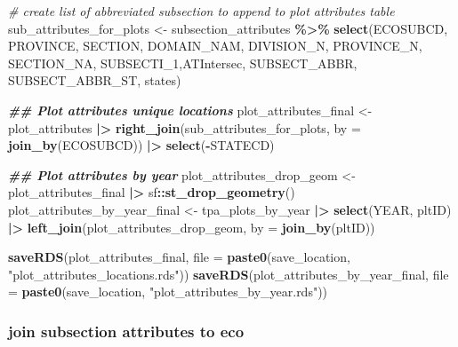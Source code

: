 \documentclass[
]{book}
\newenvironment{Shaded}{\begin{snugshade}}{\end{snugshade}}
\newcommand{\AttributeTok}[1]{\textcolor[rgb]{0.13,0.29,0.53}{#1}}
\newcommand{\CommentTok}[1]{\textcolor[rgb]{0.56,0.35,0.01}{\textit{#1}}}
\newcommand{\DocumentationTok}[1]{\textcolor[rgb]{0.56,0.35,0.01}{\textbf{\textit{#1}}}}
\newcommand{\FunctionTok}[1]{\textcolor[rgb]{0.13,0.29,0.53}{\textbf{#1}}}
\newcommand{\NormalTok}[1]{#1}
\newcommand{\OtherTok}[1]{\textcolor[rgb]{0.56,0.35,0.01}{#1}}
\newcommand{\SpecialCharTok}[1]{\textcolor[rgb]{0.81,0.36,0.00}{\textbf{#1}}}
\newcommand{\StringTok}[1]{\textcolor[rgb]{0.31,0.60,0.02}{#1}}
\begin{document}
\begin{Shaded}
\begin{Highlighting}[]
\CommentTok{\# create list of abbreviated subsection to append to plot attributes table}
\NormalTok{sub\_attributes\_for\_plots }\OtherTok{\textless{}{-}}\NormalTok{ subsection\_attributes }\SpecialCharTok{\%\textgreater{}\%}
  \FunctionTok{select}\NormalTok{(ECOSUBCD, PROVINCE, SECTION, DOMAIN\_NAM, DIVISION\_N, PROVINCE\_N,}
\NormalTok{         SECTION\_NA, SUBSECTI\_1,ATIntersec,}
\NormalTok{         SUBSECT\_ABBR, SUBSECT\_ABBR\_ST, states)}

\DocumentationTok{\#\# Plot attributes unique locations  }
\NormalTok{plot\_attributes\_final }\OtherTok{\textless{}{-}}\NormalTok{ plot\_attributes }\SpecialCharTok{|\textgreater{}}
  \FunctionTok{right\_join}\NormalTok{(sub\_attributes\_for\_plots, }\AttributeTok{by =} \FunctionTok{join\_by}\NormalTok{(ECOSUBCD)) }\SpecialCharTok{|\textgreater{}}
  \FunctionTok{select}\NormalTok{(}\SpecialCharTok{{-}}\NormalTok{STATECD) }

\DocumentationTok{\#\# Plot attributes by year}
\NormalTok{plot\_attributes\_drop\_geom }\OtherTok{\textless{}{-}}\NormalTok{ plot\_attributes\_final }\SpecialCharTok{|\textgreater{}}
\NormalTok{  sf}\SpecialCharTok{::}\FunctionTok{st\_drop\_geometry}\NormalTok{()}
\NormalTok{plot\_attributes\_by\_year\_final }\OtherTok{\textless{}{-}}\NormalTok{ tpa\_plots\_by\_year }\SpecialCharTok{|\textgreater{}}
  \FunctionTok{select}\NormalTok{(YEAR, pltID) }\SpecialCharTok{|\textgreater{}}
  \FunctionTok{left\_join}\NormalTok{(plot\_attributes\_drop\_geom, }\AttributeTok{by =} \FunctionTok{join\_by}\NormalTok{(pltID))}

\FunctionTok{saveRDS}\NormalTok{(plot\_attributes\_final, }\AttributeTok{file =} \FunctionTok{paste0}\NormalTok{(save\_location, }\StringTok{"plot\_attributes\_locations.rds"}\NormalTok{)) }
\FunctionTok{saveRDS}\NormalTok{(plot\_attributes\_by\_year\_final, }\AttributeTok{file =} \FunctionTok{paste0}\NormalTok{(save\_location, }\StringTok{"plot\_attributes\_by\_year.rds"}\NormalTok{)) }
\end{Highlighting}
\end{Shaded}

\hypertarget{join-subsection-attributes-to-eco}{%
\subsubsection{join subsection attributes to eco}\label{join-subsection-attributes-to-eco}}
\end{document}
